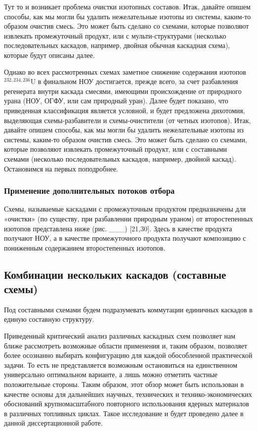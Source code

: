 Тут то и возникает проблема очистки изотопных составов. Итак, давайте опишем способы, как мы могли бы удалить нежелательные изотопы из системы, каким-то образом очистив смесь. Это может быть сделано со схемами, которые позволяют извлекать промежуточный продукт, или с мульти-структурами (несколько последовательных каскадов, например, двойная обычная каскадная схема), которые будут описаны далее.


Однако во всех рассмотренных схемах заметное снижение содержания изотопов $^{232,234,236}$U в финальном НОУ достигается, прежде всего, за счет разбавления регенерата внутри каскада смесями, имеющими происхождение от природного урана (НОУ, ОГФУ, или сам природный уран). Далее будет показано, что приведенная классификация является условной, и будет предложена дихотомия, выделяющая схемы-разбавители и схемы-очистители (от четных изотопов). Итак, давайте опишем способы, как мы могли бы удалить нежелательные изотопы из системы, каким-то образом очистив смесь. Это может быть сделано со схемами, которые позволяют извлекать промежуточный продукт, или с составными схемами (несколько последовательных каскадов, например, двойной каскад). Остановимся на первых поподробнее.

\subsubsection{Применение дополнительных потоков отбора}

Схемы, называемые каскадами с промежуточным продуктом предназначены для «очистки» (по существу, при разбавлении природным ураном) от второстепенных изотопов представлена ниже (рис. ___) [21,30]. Здесь в качестве продукта получают НОУ, а в качестве промежуточного продукта получают композицию с пониженным содержанием второстепенных изотопов.


\subsection{Комбинации нескольких каскадов (составные схемы)}\label{sec:ch1/sec2.4}
Под составными схемами будем подразумевать коммутации единичных каскадов в единую составную структуру.

Приведенный критический анализ различных каскадных схем позволяет нам ближе рассмотреть возможные области применения и, таким образом, позволяет более осознанно выбирать конфигурацию для каждой обособленной практической задачи. То есть не представляется возможным остановиться на единственном универсально оптимальном варианте, а лишь можно отметить частные положительные стороны. Таким образом, этот обзор может быть использован в качестве основы для дальнейших научных, технических и технико-экономических обоснований крупномасштабного повторного использования ядерных материалов в различных топливных циклах. Такое исследование и будет проведено далее в данной диссертационной работе.


